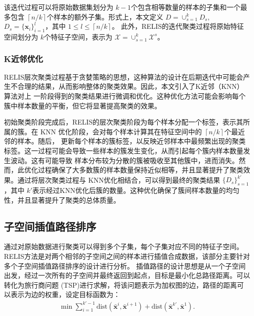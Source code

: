 \documentclass[12pt,a4paper]{article}%
\begin{document}
	

	该迭代过程可以将原始数据集划分为 $k-1$个包含相等数量的样本的子集和一个最多包含 $\left\lceil n/k\right\rceil$个样本的额外子集。形式上，本文定义 $D={\cup}^k_{s=1}D_s$, $D_s=\{\boldsymbol{x}_i\}_{i=1}^l$，其中 $1 {\le} l {\le} \left\lceil n/k\right\rceil$。
	此外，RELIS的迭代聚类过程将原始特征空间划分为 $k$个特征子空间，表示为 $\mathcal{X} = \cup_{s=1}^{k} \mathcal{X}^s$。



	\subsubsection{K近邻优化}
	RELIS层次聚类过程基于贪婪策略的思想，这种算法的设计在后期迭代中可能会产生不合理的结果，从而影响整体的聚类效果。因此，本文引入了K近邻（KNN）算法对上
	一阶段得到的聚类结果进行微调和优化。这种优化方法可能会影响每个簇中样本数量的平衡，但它将显著提高聚类的效果。
	
	初始聚类阶段完成后，RELIS的层次聚类阶段为每个样本分配一个标签，表示其所属的簇。在 KNN 优化阶段，会对每个样本计算其在特征空间中的 $\left\lceil n/k\right\rceil$个最近邻的样本。随后，
	更新每个样本的簇标签，以反映近邻样本中最频繁出现的聚类标签。这一过程可能会导致一些样本的簇发生变化，从而引起每个簇内样本数量发生波动。这有可能导致
	样本分布较为分散的簇被吸收至其他簇中，进而消失。然而，此优化过程确保了大多数簇的样本数量保持近似相等，并且显著提升了聚类效果。通过将层次聚类过程与
	KNN优化相结合，可以得到最终的聚类结果 $\{D_s\}_{s=1}^{k'}$，其中 $k'$表示经过KNN优化后簇的数量。这种优化确保了簇间样本数量的均匀性，并且显著提升了聚类的总体质量。
	
	\subsection{子空间插值路径排序}

	通过对原始数据进行聚类可以得到多个子集，每个子集对应不同的特征子空间。RELIS方法是对两个相邻的子空间之间的样本进行插值合成数据，该部分主要针对多个子空间插值路径排序的设计进行分析。
	插值路径的设计思想是从一个子空间出发，经过一次所有的子空间并最终返回到起点，目标是最小化总路径距离。可以转化为旅行商问题 (TSP)进行求解，将该问题表示为加权图的边，路径的距离可以表示为边的权重，设定目标函数为：
	\begin{align}
		\min{\sum\limits_{i=1}^{k'-1}\text{dist}(\boldsymbol{\bar{x}}^i,\boldsymbol{\bar{x}}^{i+1})}+\text{dist}(\boldsymbol{\bar{x}}^{k'},\boldsymbol{\bar{x}}^1). \end{align}
			
\end{document}
